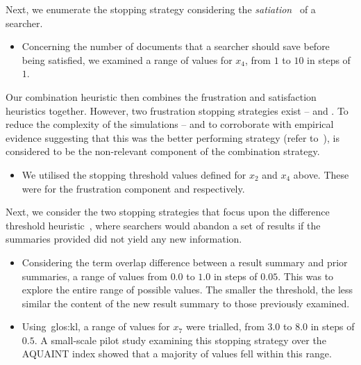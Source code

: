 Next, we enumerate the stopping strategy considering the \emph{satiation}~\citep{simon1955satiation} of a searcher.

\begin{itemize}
    \item{ Concerning the number of documents that a searcher should save before being satisfied, we examined a range of values for $x_4$, from $1$ to $10$ in steps of $1$.}
\end{itemize}

Our combination heuristic then combines the frustration and satisfaction heuristics together. However, two frustration stopping strategies exist --  and . To reduce the complexity of the simulations -- and to corroborate with empirical evidence suggesting that this was the better performing strategy (refer to~\cite{maxwell2015stopping_strategies}),  is considered to be the non-relevant component of the combination strategy.

\begin{itemize}
    \item{ We utilised the stopping threshold values defined for $x_2$ and $x_4$ above. These were for the frustration component  and  respectively.}
\end{itemize}

Next, we consider the two stopping strategies that focus upon the difference threshold heuristic~\citep{nickles1995judgment}, where searchers would abandon a set of results if the summaries provided did not yield any new information.

\begin{itemize}
    \item{ Considering the term overlap difference between a result summary and prior summaries, a range of values from $0.0$ to $1.0$ in steps of $0.05$. This was to explore the entire range of possible values. The smaller the threshold, the less similar the content of the new result summary to those previously examined.}
    
    \item{ Using~\gls{glos:kl}, a range of values for $x_7$ were trialled, from $3.0$ to $8.0$ in steps of $0.5$. A small-scale pilot study examining this stopping strategy over the AQUAINT index showed that a majority of values fell within this range.}
\end{itemize}

